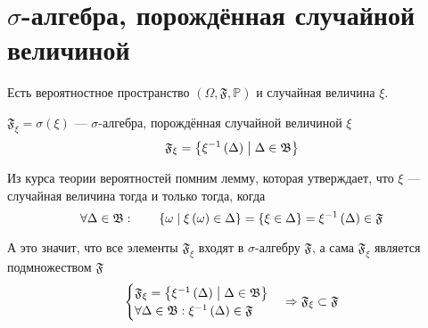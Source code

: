 \section{$\sigma$-алгебра, порождённая случайной величиной}
Есть вероятностное пространство
$\left( \Omega, \mathfrak{F}, \mathbb{P} \right)$
и случайная величина $\xi$.

\begin{definition}
  $\mathfrak{F}_\xi = \sigma\left( \xi \right)$
  --- $\sigma$-алгебра, порождённая случайной величиной $\xi$
  $$\mathfrak{F}_\xi
      = \left\{ \xi^{-1}\left( \Delta \right)
      \;\middle|\; \Delta\in\mathfrak{B} \right\}$$
\end{definition}

Из курса теории вероятностей помним лемму, которая утверждает,
что $\xi$ --- случайная величина тогда и только тогда, когда
\begin{equation*}
  \forall\Delta\in\mathfrak{B}:\qquad
  \left\{ \omega \;\middle|\; \xi\left( \omega \right) \in \Delta \right\}
  = \left\{ \xi\in\Delta \right\}
  = \xi^{-1}\left( \Delta \right) \in \mathfrak{F}
\end{equation*}

А это значит, что все элементы $\mathfrak{F}_\xi$ входят в $\sigma$-алгебру
$\mathfrak{F}$, а сама $\mathfrak{F}_\xi$ является подмножеством
$\mathfrak{F}$
\begin{align*}
  \begin{cases}
      \mathfrak{F}_\xi
      = \left\{ \xi^{-1}\left( \Delta \right)
          \;\middle|\; \Delta\in\mathfrak{B} \right\}\\
      \forall\Delta\in\mathfrak{B}:
      \xi^{-1}\left( \Delta \right) \in \mathfrak{F}
  \end{cases}
  \Rightarrow
  \mathfrak{F}_\xi \subset \mathfrak{F}
\end{align*}


